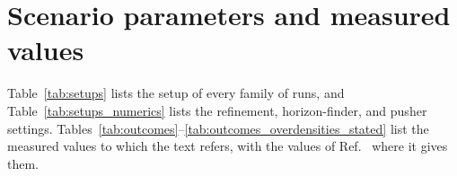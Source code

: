 \section{Scenario parameters and measured values}\label{app:parameters}

Table~\ref{tab:setups} lists the setup of every family of runs, and Table~\ref{tab:setups_numerics} lists the refinement, horizon-finder, and pusher settings. Tables~\ref{tab:outcomes}--\ref{tab:outcomes_overdensities_stated} list the measured values to which the text refers, with the values of Ref.~\cite{Wu:2026nrpic} where it gives them.



